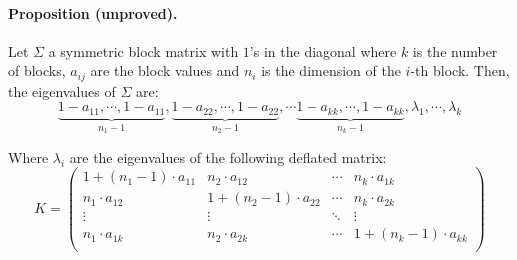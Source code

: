 \documentclass[a4paper,12pt,final]{article}
\begin{document}
\paragraph{Proposition (unproved).} Let $\Sigma$ a symmetric block matrix with 
$1$'s in the diagonal where $k$ is the number of blocks, $a_{ij}$ are the block 
values and $n_i$ is the dimension of the $i$-th block. Then, the eigenvalues 
of $\Sigma$ are:
\begin{displaymath}
\underbrace{1-a_{11}, \cdots, 1-a_{11}}_{n_1-1},
\underbrace{1-a_{22}, \cdots, 1-a_{22}}_{n_2-1},  
\cdots
\underbrace{1-a_{kk}, \cdots, 1-a_{kk}}_{n_k-1},  
\lambda_1, \cdots, \lambda_k
\end{displaymath}

Where $\lambda_i$ are the eigenvalues of the following deflated matrix:
\begin{displaymath}
K = \left(
\begin{array}{cccc}
1+(n_1-1) \cdot a_{11} & n_2 \cdot a_{12}       & \cdots & n_k \cdot a_{1k}       \\
      n_1 \cdot a_{12} & 1+(n_2-1) \cdot a_{22} & \cdots & n_k \cdot a_{2k}       \\
\vdots                 & \vdots                 & \ddots & \vdots                 \\
n_1 \cdot a_{1k}       & n_2 \cdot a_{2k}       & \cdots & 1+(n_k-1) \cdot a_{kk} \\
\end{array}
\right)
\end{displaymath}


\newpage


\end{document}
